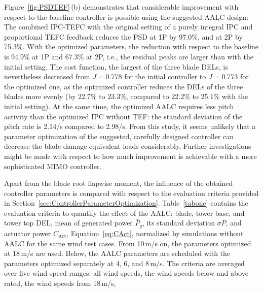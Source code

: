 Figure~\ref{fig:PSDTEF}\,(b) demonstrates that considerable improvement with respect to the baseline controller is possible using the suggested AALC design: The combined IPC-TEFC with the original setting of a purely integral IPC and proportional TEFC feedback reduces the PSD at 1P by 97.0\%, and at 2P by 75.3\%. With the optimized parameters, the reduction with respect to the baseline is 94.9\% at 1P and 67.3\% at 2P, i.e., the residual peaks are larger than with the initial setting. The cost function, the largest of the three blade DELs, is nevertheless decreased from $J = 0.778$ for the initial controller to $J = 0.773$ for the optimized one, as the optimized controller reduces the DELs of the three blades more evenly (by 22.7\% to 23.3\%, compared to 22.2\% to 25.1\% with the initial setting). At the same time, the optimized AALC requires less pitch activity than the optimized IPC without TEF: the standard deviation of the pitch rate is 2.14\textdegree/s compared to 2.98\textdegree/s.
From this study, it seems unlikely that a parameter optimization of the suggested, carefully designed controller can decrease the blade damage equivalent loads considerably. Further investigations might be made with respect to how much improvement is achievable with a more sophisticated MIMO controller.

Apart from the blade root flapwise moment, the influence of the obtained controller parameters is compared with respect to the evaluation criteria provided in Section~\ref{sec:ControllerParameterOptimization}.
%
Table~\ref{tabone} contains the evaluation criteria to quantify the effect of the AALC: blade, tower base, and tower top DEL, mean of generated power $\bar{P}_{g}$, its standard deviation $\sigma P$, and actuator power $C_{\text{Act}}$, Equation~\eqref{eq:CAct}, normalized by simulations without AALC for the same wind test cases. From 10\,m/s on, the parameters optimized at 18\,m/s are used. Below, the AALC parameters are scheduled with the parameters optimized separately at 4, 6, and 8\,m/s. The criteria are averaged over five wind speed ranges: all wind speeds, the wind speeds below and above rated, the wind speeds from 18\,m/s, 


